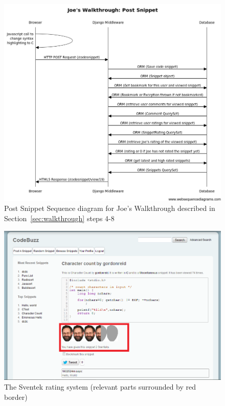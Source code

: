 \documentclass{sig-alt-release2}
\begin{document}
\begin{figure}
\centering
\includegraphics[scale=0.6]{../imgs/walkthroughseqdiag-postsnippet.png}
\caption{Post Snippet Sequence diagram for Joe's Walkthrough described in
Section~\ref{sec:walkthrough} steps 4-8}
\label{fig:postseqdiag}
\end{figure}

\begin{figure}
\centering
\includegraphics[scale=0.7]{../imgs/joerating.png}
\caption{The Sventek rating system (relevant parts surrounded by red border)}
\label{fig:joerating}
\end{figure}
\end{document}

